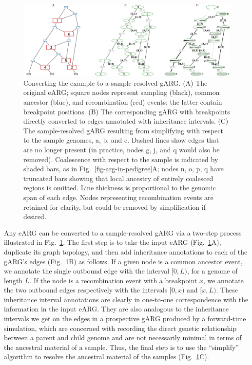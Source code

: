 \documentclass{article}
\newcommand{\noderef}[1]{\textsf{#1}}
\begin{document}
\begin{figure}
\centering
\includegraphics[width=\textwidth]{illustrations/ancestry-resolution}
\caption{\label{fig-ancestry-resolution}
Converting the \citet[][Fig.~1]{wiuf1999recombination} example
to a sample-resolved gARG. (A) The original eARG; square nodes
represent sampling (black), common ancestor (blue), and recombination (red) events;
the latter contain breakpoint positions.
(B) The corresponding gARG with breakpoints directly converted to
edges annotated with inheritance intervals.
(C) The sample-resolved gARG resulting from simplifying with respect
to the sample genomes, \noderef{a}, \noderef{b}, and \noderef{c}.
Dashed lines show edges that are
no longer present (in practice, nodes \noderef{g}, \noderef{j}, and \noderef{q} would also be removed).
Coalescence with respect to the sample is indicated by shaded bars, as
in Fig.~\ref{fig-arg-in-pedigree}A; nodes \noderef{n}, \noderef{o}, \noderef{p}, \noderef{q} have truncated
bars showing that local ancestry of entirely coalesced regions is omitted.
Line thickness is proportional to the genomic span of each edge.
Nodes representing recombination events are retained
for clarity, but could be removed by simplification if
desired.
}
\end{figure}

Any eARG can be converted to a sample-resolved gARG
via a two-step process illustrated in Fig.~\ref{fig-ancestry-resolution}.
The first step is to take the input eARG (Fig.~\ref{fig-ancestry-resolution}A),
duplicate its graph topology, and then add inheritance annotations
to each of the gARG's edges (Fig.~\ref{fig-ancestry-resolution}B) as follows.
If a given node is a common ancestor event, we annotate the single
outbound edge with the interval $[0,L)$, for a genome of length $L$. If the
node is a recombination event with a breakpoint $x$, we annotate the two
outbound edges respectively with the intervals $[0, x)$ and $[x, L)$. These
inheritance interval annotations are clearly in one-to-one correspondence with
the information in the input eARG. They are also analogous to the
inheritance intervals we get on the edges in a prospective gARG
produced by a forward-time simulation, which are concerned with recording
the direct genetic relationship between a parent and child genome and are not
necessarily minimal in terms of the ancestral material of a sample.
Thus, the final step is to use the ``simplify'' algorithm to resolve the
ancestral material of the samples (Fig.~\ref{fig-ancestry-resolution}C).
\end{document}
